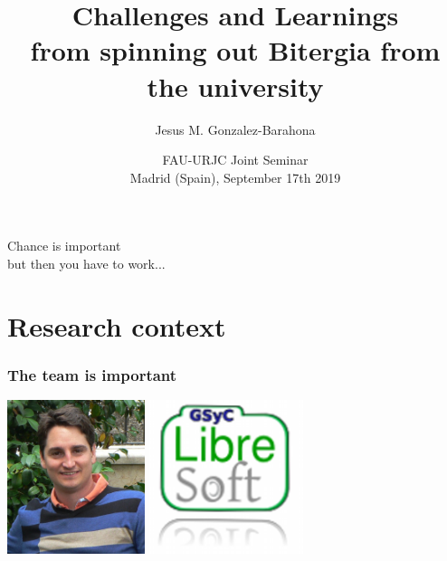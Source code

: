 \documentclass[17pt,aspectratio=169,hyperref=pdfusetitle]{beamer}
\title[Spinning out Bitergia]{Challenges and Learnings \\
  from spinning out Bitergia from the university}
\author[Jesus M. Gonzalez-Barahona]{Jesus M. Gonzalez-Barahona}
\institute[URJC]{Universidad Rey Juan Carlos \\
  @jgbarah ~~~~~ \url{http://github.com/jgbarah/presentations}}
\date[FAU-URJC 2019]{FAU-URJC Joint Seminar \\ Madrid (Spain), September 17th 2019}
\begin{document}
\begin{frame}
  \maketitle
\end{frame}


\begin{frame}

  {\em
    \begin{center}
      Chance is important \\
      but then you have to work...\\
    \end{center}
  }
\end{frame}





\section{Research context}

\begin{frame}[fragile]
  \frametitle{The team is important}

  \begin{center}
  \includegraphics[height=4.5cm]{figs/gregorio-robles}
  \includegraphics[height=4.5cm]{figs/libresoft}
  \end{center}  
  
\end{frame}
\end{document}
